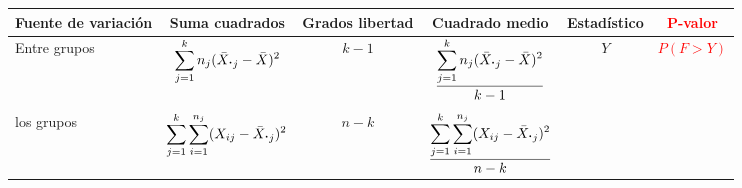     \hspace{-1cm}
    \begin{minipage}{15cm}{
    \begin{tabular}{lccccc}
    \hline
    {\small Fuente de variación}&{\small Suma cuadrados}&{\small Grados libertad}&{\small Cuadrado medio}&{\small Estadístico}&\textcolor{red}{\small P-valor}\\
    \hline
    {\small Entre grupos}&{\scriptsize $\displaystyle\sum_{j=1}^k n_j(\bar X_{\mbox{\bf\large $\cdot$}j}-\bar X)^2$}&$k-1$&{\scriptsize $\dfrac{\displaystyle\sum_{j=1}^k n_j(\bar X_{\mbox{\bf\large $\cdot$}j}-\bar X)^2}{k-1}$}&$Y$&\textcolor{red}{$P(F>Y)$}\\

    \begin{minipage}{2cm}{\small Dentro de\\ los grupos}\end{minipage}&{\scriptsize $\displaystyle\sum_{j=1}^k\sum_{i=1}^{n_j}(X_{ij}-\bar X_{\mbox{\bf\large $\cdot$}j})^2$}&$n-k$&{\scriptsize $\dfrac{\displaystyle\sum_{j=1}^k\sum_{i=1}^{n_j}(X_{ij}-\bar X_{\mbox{\bf\large $\cdot$}j})^2}{n-k}$}\\
    \hline
    \end{tabular}
    }
    \end{minipage}
